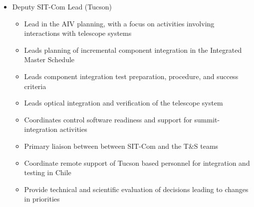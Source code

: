 \documentclass[SE,lsstdraft,authoryear,toc]{lsstdoc}
\begin{document}
\begin{itemize}
\begin{itemize}
    \end{itemize}
\item Deputy SIT-Com Lead (Tucson)
    \begin{itemize}
        \item Lead in the AIV planning, with a focus on activities involving interactions with telescope systems
        \item Leads planning of incremental component integration in the Integrated Master Schedule
        \item Leads component integration test preparation, procedure, and success criteria
        \item Leads optical integration and verification of the telescope system
        \item Coordinates control software readiness and support for summit-integration activities
        \item Primary liaison between between SIT-Com and the T\&S teams
        \item Coordinate remote support of Tucson based personnel for integration and testing in Chile
        \item Provide technical and scientific evaluation of decisions leading to changes in priorities
    \end{itemize}
\end{itemize}
\end{document}
